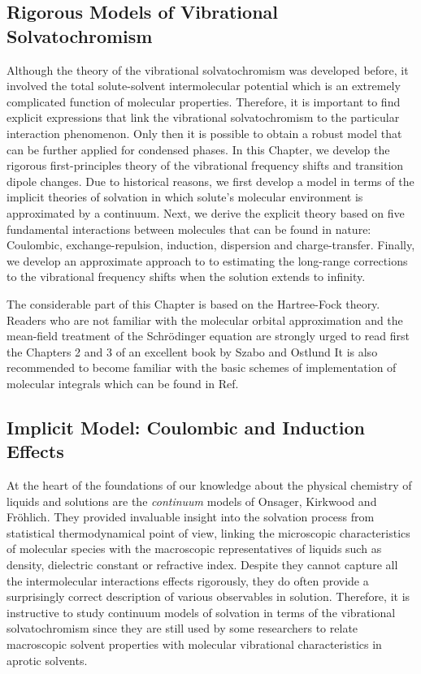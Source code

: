 \documentclass[a4paper,titlepage,twoside,fleqn,12pt]{book}
\begin{document}
\begin{refsection}
\chapter{Rigorous Models of Vibrational Solvatochromism \label{c:my-model}}

Although the theory of the vibrational solvatochromism
was developed before, it involved the total solute\hyp{}solvent
intermolecular potential which is an extremely complicated function
of molecular properties.
Therefore, it is important to find explicit 
expressions that link the vibrational solvatochromism
to the particular interaction phenomenon.
Only then it is possible to obtain a robust model
that can be further applied for condensed phases. 
In this Chapter, we develop the rigorous first\hyp{}principles
theory of the vibrational frequency shifts and transition
dipole changes.
Due to historical reasons, we first develop a model in terms
of the implicit theories of solvation in which solute's molecular
environment is approximated by a continuum. 
Next, we derive the explicit theory based on five fundamental interactions
between molecules that can be found in nature: Coulombic, 
exchange\hyp{}repulsion, induction, dispersion and charge\hyp{}transfer.
Finally, we develop an approximate approach to
to estimating the long\hyp{}range corrections to the vibrational
frequency shifts when the solution extends to infinity. 

The considerable
part of this Chapter is based on the Hartree\hyp{}Fock theory. \citep{Roothaan.RevModPhys.1951}
Readers who
are not familiar with the molecular orbital approximation and the mean\hyp{}field
treatment of the Schr{\"o}dinger equation are strongly urged to read first the
Chapters 2 and 3 of an excellent book by Szabo and Ostlund \citep{Szabo.Ostlund.ModernQuantumChemistry.1996}
It is also recommended to become familiar with the basic schemes of implementation of molecular
integrals which can be found in Ref. \citep{Cook.HandbookOfComputationalQuantumChemistry.2005}

\section{Implicit Model: Coulombic and Induction Effects\label{s:implicit-model}}

At the heart of the foundations of our knowledge about the 
physical chemistry of liquids and solutions are the \emph{continuum}
models of Onsager, Kirkwood and Fr{\"o}hlich. They
provided invaluable insight into the solvation
process from statistical thermodynamical point of view, linking
the microscopic characteristics of molecular species
with the macroscopic representatives of liquids
such as density, dielectric constant or refractive index.
Despite they cannot capture all the intermolecular
interactions effects rigorously, they do often provide a surprisingly 
correct
description of various observables in solution.
Therefore, it is instructive to study continuum models of solvation
in terms of the vibrational solvatochromism since they 
are still used by some researchers to relate macroscopic
solvent properties with molecular vibrational characteristics
in aprotic solvents.


\end{refsection}
\end{document}
